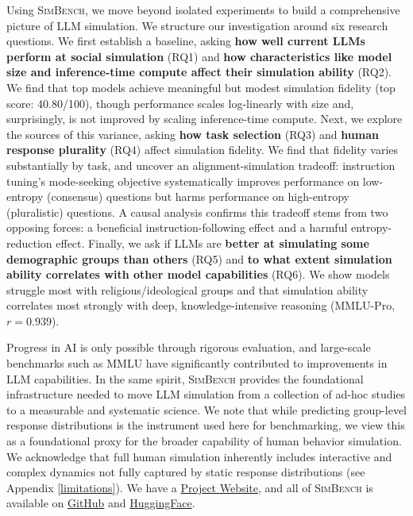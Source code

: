 \documentclass{article} %
\begin{document}
Using \textsc{SimBench}, we move beyond isolated experiments to build a comprehensive picture of LLM simulation. We structure our investigation around six research questions. We first establish a baseline, asking \textbf{how well current LLMs perform at social simulation} (RQ1) and \textbf{how characteristics like model size and inference-time compute affect their simulation ability} (RQ2). We find that top models achieve meaningful but modest simulation fidelity (top score: 40.80/100), though performance scales log-linearly with size and, surprisingly, is not improved by scaling inference-time compute. Next, we explore the sources of this variance, asking \textbf{how task selection} (RQ3) and \textbf{human response plurality} (RQ4) affect simulation fidelity. We find that fidelity varies substantially by task, and uncover an alignment-simulation tradeoff: instruction tuning's mode-seeking objective systematically improves performance on low-entropy (consensus) questions but harms performance on high-entropy (pluralistic) questions. A causal analysis confirms this tradeoff stems from two opposing forces: a beneficial instruction-following effect and a harmful entropy-reduction effect. Finally, we ask if LLMs are \textbf{better at simulating some demographic groups than others} (RQ5) and \textbf{to what extent simulation ability correlates with other model capabilities} (RQ6). We show models struggle most with religious/ideological groups and that simulation ability correlates most strongly with deep, knowledge-intensive reasoning (MMLU-Pro, $r=0.939$).

Progress in AI is only possible through rigorous evaluation, and large-scale benchmarks such as MMLU \citep{hendrycks2020measuring} have significantly contributed to improvements in LLM capabilities. In the same spirit, \textsc{SimBench} provides the foundational infrastructure needed to move LLM simulation from a collection of ad-hoc studies to a measurable and systematic science. We note that while predicting group-level response distributions is the instrument used here for benchmarking, we view this as a foundational proxy for the broader capability of human behavior simulation. We acknowledge that full human simulation inherently includes interactive and complex dynamics not fully captured by static response distributions (see Appendix \ref{limitations}). We have a \href{http://simbench.tiancheng.hu/}{Project Website}, and all of \textsc{SimBench} is available on \href{https://github.com/pitehu/SimBench_release/}{GitHub} and \href{https://huggingface.co/datasets/pitehu/SimBench}{HuggingFace}.
\end{document}
